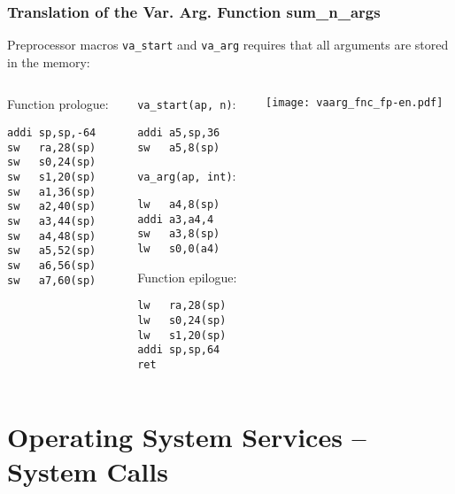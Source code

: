 \documentclass{beamer}
\begin{document}
\begin{frame}[fragile,shrink=5]
\frametitle{Translation of the Var. Arg. Function sum\_n\_args}

Preprocessor macros \texttt{va\_start} and \texttt{va\_arg} requires that all arguments are stored in the memory:

\begin{columns}
\begin{column}{0.25\textwidth}
Function prologue:

\begin{verbatim}
addi sp,sp,-64
sw   ra,28(sp)
sw   s0,24(sp)
sw   s1,20(sp)
sw   a1,36(sp)
sw   a2,40(sp)
sw   a3,44(sp)
sw   a4,48(sp)
sw   a5,52(sp)
sw   a6,56(sp)
sw   a7,60(sp)
\end{verbatim}
\end{column}   
\begin{column}{0.4\textwidth}
\texttt{va\_start(ap, n)}:

\begin{verbatim}
addi a5,sp,36
sw   a5,8(sp)
\end{verbatim}
\texttt{va\_arg(ap, int)}:
\begin{verbatim}
lw   a4,8(sp)
addi a3,a4,4
sw   a3,8(sp)
lw   s0,0(a4)
\end{verbatim}

Function epilogue:

\begin{verbatim}
lw   ra,28(sp)
lw   s0,24(sp)
lw   s1,20(sp)
addi sp,sp,64
ret
\end{verbatim}
\end{column}
\begin{column}{0.3\textwidth}  
\texttt{[image: vaarg\_fnc\_fp-en.pdf]}
\end{column}
\end{columns}
\end{frame}


\section {Operating System Services -- System Calls}
\end{document}
